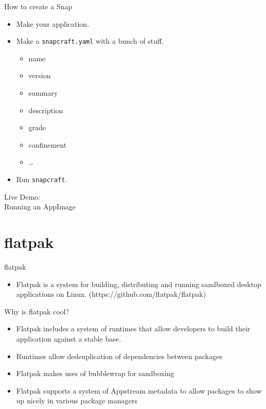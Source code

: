\documentclass{lug}
\begin{document}
\begin{frame}{How to create a Snap}
    \begin{itemize}
        \item Make your application.
        \item Make a \texttt{snapcraft.yaml} with a bunch of stuff.
            \begin{itemize}
                \item name
                \item version
                \item summary
                \item description
                \item grade
                \item confinement
                \item \dots
            \end{itemize}
        \item Run \texttt{snapcraft}.
    \end{itemize}
\end{frame}

\begin{frame}[standout]
    \Huge
    Live Demo:\\
    Running an AppImage
\end{frame}

\section{flatpak}
\begin{frame}{flatpak}
    \begin{itemize}
        \item Flatpak is a system for building, distributing and running sandboxed desktop applications on Linux. (https://github.com/flatpak/flatpak)
    \end{itemize}
\end{frame}

\begin{frame}{Why is flatpak cool?}
    \begin{itemize}
        \item Flatpak includes a system of runtimes that allow developers to build their application against a stable base.
        \item Runtimes allow dedeuplication of dependencies between packages
        \item Flatpak makes uses of bubblewrap for sandboxing
        \item Flatpak supports a system of Appstream metadata to allow packages to show up nicely in various package managers
    \end{itemize}
\end{frame}
\end{document}
